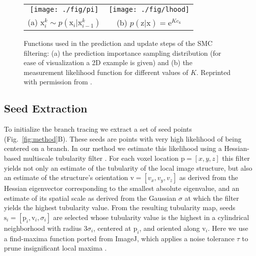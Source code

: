 \begin{figure}[b!]
\begin{tabular}{@{}c@{\ }c@{}}
\texttt{[image: ./fig/pi]} &
\texttt{[image: ./fig/lhood]} \\
\hspace{2em} (a) $\mathrm{x}_{i}^k \sim p(\mathrm{x}_i | \mathrm{x}_{i-1}^k)$ &
\hspace{2em} (b) $p(\mathrm{z} | \mathrm{x})=\textrm{e}^{Kc_{\mathrm{x}}}$ \\
\end{tabular}
\caption{Functions used in the prediction and update steps of the SMC filtering: (a) the prediction importance sampling distribution (for ease of visualization a 2D example is given) and (b) the measurement likelihood function for different values of $K$. Reprinted with permission from \cite{radojevic2017neuron}.}
\label{fig:pred-lhood}
\end{figure}

\subsection{Seed Extraction}
\label{subsec:seed-extraction}
To initialize the branch tracing we extract a set of seed points (Fig.~\ref{fig:method}B). These seeds are points with very high likelihood of being centered on a branch. In our method we estimate this likelihood using a Hessian-based multiscale tubularity filter \citep{frangi1998multiscale}. For each voxel location $\mathrm{p} = [x,y,z]$ this filter yields not only an estimate of the tubularity of the local image structure, but also an estimate of the structure's orientation $\mathrm{v} = [ v_x, v_y, v_z ]$ as derived from the Hessian eigenvector corresponding to the smallest absolute eigenvalue, and an estimate of its spatial scale as derived from the Gaussian $\sigma$ at which the filter yields the highest tubularity value. From the resulting tubularity map, seeds $\mathrm{s}_i = [ \mathrm{p}_i, \mathrm{v}_i, \sigma_i ]$ are selected whose tubularity value is the highest in a cylindrical neighborhood with radius $3\sigma_i$, centered at $\mathrm{p}_i$, and oriented along $\mathrm{v}_i$. Here we use a find-maxima function ported from ImageJ, which applies a noise tolerance $\tau$ to prune insignificant local maxima \citep{imagejguide}.

